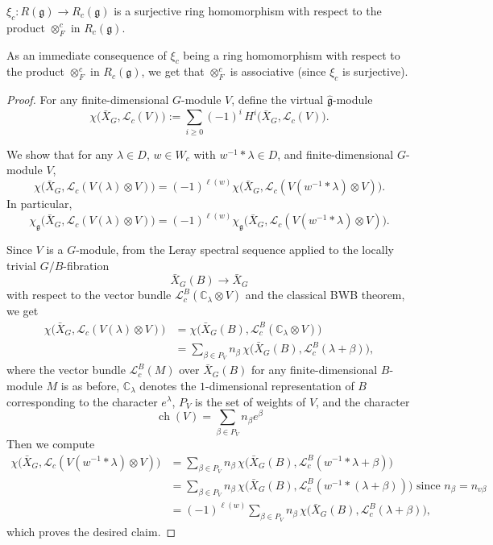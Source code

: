 \documentclass[12pt]{article}
\begin{document}
\begin{theorem}
    $\xi_c:R(\mathfrak g)\to R_c(\mathfrak g)$ is a surjective ring homomorphism with respect to the product \(\otimes_F^c\) in \(R_c(\mathfrak g)\).
\end{theorem}
 As an immediate consequence of \(\xi_c\) being a ring homomorphism with respect to the product \(\otimes_F^c\) in \(R_c(\mathfrak g)\), we get that \(\otimes_F^c\) is associative (since \(\xi_c\) is surjective).
\begin{proof}
For any finite-dimensional \(G\)-module \(V\), define the virtual \(\hat{\mathfrak g}\)-module
\[
\chi\bigl(\bar X_G,\mathcal L_c(V)\bigr)
:=
\sum_{i\ge 0}(-1)^i\, H^i\bigl(\bar X_G,\mathcal L_c(V)\bigr).
\]

We show that for any \(\lambda\in D\), \(w\in W_c\) with \(w^{-1}*\lambda\in D\), and finite-dimensional \(G\)-module \(V\),
\begin{equation}\label{eq:relation}
\chi\bigl(\bar X_G,\mathcal L_c(V(\lambda)\otimes V)\bigr)
=
(-1)^{\ell(w)}
\chi\bigl(\bar X_G,\mathcal L_c(V(w^{-1}*\lambda)\otimes V)\bigr).
\end{equation}
In particular,
\begin{equation}
\chi_{\mathfrak g}\bigl(\bar X_G,\mathcal L_c(V(\lambda)\otimes V)\bigr)
=
(-1)^{\ell(w)}
\chi_{\mathfrak g}\bigl(\bar X_G,\mathcal L_c(V(w^{-1}*\lambda)\otimes V)\bigr).
\end{equation}

Since \(V\) is a \(G\)-module, from the Leray spectral sequence applied to the locally trivial \(G/B\)-fibration
\[
\bar X_G(B)\to \bar X_G
\]
with respect to the vector bundle \(\mathcal L_c^B(\mathbb C_\lambda\otimes V)\) and the classical BWB theorem, we get
\begin{align}
\chi\bigl(\bar X_G,\mathcal L_c(V(\lambda)\otimes V)\bigr)
&=
\chi\bigl(\bar X_G(B),\mathcal L_c^B(\mathbb C_\lambda\otimes V)\bigr) \nonumber\\
&=
\sum_{\beta\in P_V} n_\beta\, \chi\bigl(\bar X_G(B),\mathcal L_c^B(\lambda+\beta)\bigr),
\end{align}
where the vector bundle \(\mathcal L_c^B(M)\) over \(\bar X_G(B)\) for any finite-dimensional \(B\)-module \(M\) is as before, \(\mathbb C_\lambda\) denotes the \(1\)-dimensional representation of \(B\) corresponding to the character \(e^\lambda\), \(P_V\) is the set of weights of \(V\), and the character
\[
\operatorname{ch}(V)=\sum_{\beta\in P_V} n_\beta e^\beta
\]
Then we compute
\begin{align}
\chi\bigl(\bar X_G,\mathcal L_c(V(w^{-1}*\lambda)\otimes V)\bigr)
&=
\sum_{\beta\in P_V} n_\beta\, \chi\bigl(\bar X_G(B),\mathcal L_c^B(w^{-1}*\lambda+\beta)\bigr) \nonumber\\
&=
\sum_{\beta\in P_V} n_\beta\, \chi\bigl(\bar X_G(B),\mathcal L_c^B(w^{-1}*(\lambda+\beta))\bigr) \text{ since } n_\beta=n_{v\beta} \nonumber\\
&=
(-1)^{\ell(w)}
\sum_{\beta\in P_V} n_\beta\, \chi\bigl(\bar X_G(B),\mathcal L_c^B(\lambda+\beta)\bigr),
\end{align} which proves the desired claim.


\end{proof}
\end{document}
